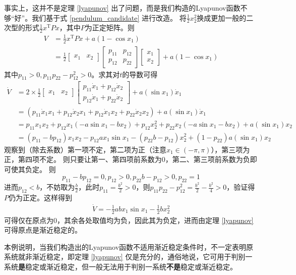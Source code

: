 \begin{example}[利用Lyapunov稳定性定理判别单摆系统稳定性]
事实上，这并不是定理 \ref{lyapunov} 出了问题，而是我们构造的Lyapunov函数不够“好”。我们基于式 \eqref{pendulum_candidate} 进行改造。
将$\frac12x_2^2$换成更加一般的二次型的形式$\frac12x^\mathrm{T}Px$，其中$P$为正定矩阵。则
\begin{align*}
  V&=\frac{1}{2}x^\mathrm{T}Px+a(1-\cos x_1)\\
  &=\frac{1}{2}\begin{bmatrix}
  x_1&x_2
  \end{bmatrix}\begin{bmatrix}
    p_{11}&p_{12}\\p_{12}&p_{22}
    \end{bmatrix}\begin{bmatrix}
      x_1\\x_2
      \end{bmatrix}+a(1-\cos x_1)
\end{align*}
其中$p_{11}>0,p_{11}p_{22}-p_{12}^2>0$。求其对$t$的导数可得\begin{align*}
  \dot{V}&=2\times \frac{1}{2}\begin{bmatrix}
    x_1&x_2
    \end{bmatrix}\begin{bmatrix}
      p_{11}\dot{x}_1+p_{12}\dot{x}_2\\p_{12}\dot{x}_1+p_{22}\dot{x}_2
      \end{bmatrix}+a(\sin x_1)\dot{x}_1\\
    &=\left(p_{11}\dot{x}_1x_1+p_{12}\dot{x}_2x_1+p_{12}\dot{x}_1x_2+p_{22}\dot{x}_2x_2\right)
        +a(\sin x_1)\dot{x}_1\\
      &=p_{11}x_1x_2+p_{12}x_1(-a\sin x_1-bx_2)+p_{12}x_2^2+p_{22}x_2(-a\sin x_1-bx_2)
      +a(\sin x_1)x_2\\
    &=(p_{11}-bp_{12})x_1x_2-p_{12}ax_1\sin x_1-(p_{22}b-p_{12})x_2^2+(1-p_{22})a(\sin x_1)x_2
\end{align*}
观察到（除去系数）第一项不定，第二项为正（注意$x_1\in(-\pi,\pi)$），第三项为正，第四项不定。
则只要让第一、第四项前系数为0，第二、第三项前系数为负即可使其负定。
则\[p_{11}-bp_{12}=0,p_{12}>0,p_{22}b-p_{12}>0,p_{22}=1\]
进而$p_{12}<b$，不妨取为$\frac{b}{2}$，此时$p_{11}=\frac{b^2}{2}>0$，则$p_{11}p_{22}-p_{12}^2=\frac{b^2}{2}-\frac{b^2}{4}>0$，验证得$P$仍为正定。这样得到
\begin{align*}
  \dot{V}=-\frac{1}{2}abx_1\sin x_1-\frac{1}{2}bx_2^2
\end{align*}
可得仅在原点为$0$，其余各处取值均为负，因此其为负定，进而由定理 \ref{lyapunov} 可得原点是渐近稳定的。

本例说明，当我们构造出的Lyapunov函数不适用渐近稳定条件时，不一定表明原系统就非渐近稳定，即定理 \ref{lyapunov} 仅是充分的，通俗地说，它可用于判别一系统{\bf 是}稳定或渐近稳定，但一般无法用于判别一系统{\bf 不是}稳定或渐近稳定。
\end{example}
